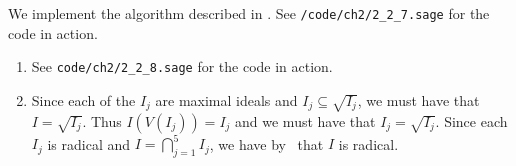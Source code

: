\documentclass[letterpaper, 11pt, oneside]{book}
\begin{document}
\begin{sol}\label{ex:UAG_2.2.7}
  We implement the algorithm described in .
  See \texttt{/code/ch2/2\_2\_7.sage} for the code in action.
\end{sol}

\begin{sol}\label{ex:UAG_2.2.8}
  \begin{enumerate}
    \item See \texttt{code/ch2/2\_2\_8.sage} for the code in action.
    \item Since each of the $I_{j}$ are maximal ideals and $I_{j} \subseteq \sqrt{I_{j}}$, we must have that $I = \sqrt{I_{j}}$.
          Thus $I(V(I_{j})) = I_{j}$ and we must have that $I_{j} = \sqrt{I_{j}}$.
          Since each $I_{j}$ is radical and $I = \bigcap_{j = 1}^{5} I_{j}$, we have by~ that $I$ is radical.
  \end{enumerate}
\end{sol}

\clearpage
\end{document}
